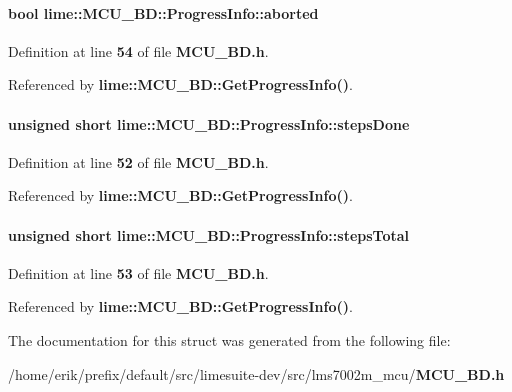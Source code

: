 \paragraph[{aborted}]{\setlength{\rightskip}{0pt plus 5cm}bool lime\+::\+M\+C\+U\+\_\+\+B\+D\+::\+Progress\+Info\+::aborted}\label{structlime_1_1MCU__BD_1_1ProgressInfo_ab5d35d043db9c1d51e6926514402bb37}


Definition at line {\bf 54} of file {\bf M\+C\+U\+\_\+\+B\+D.\+h}.



Referenced by {\bf lime\+::\+M\+C\+U\+\_\+\+B\+D\+::\+Get\+Progress\+Info()}.

\paragraph[{steps\+Done}]{\setlength{\rightskip}{0pt plus 5cm}unsigned short lime\+::\+M\+C\+U\+\_\+\+B\+D\+::\+Progress\+Info\+::steps\+Done}\label{structlime_1_1MCU__BD_1_1ProgressInfo_ac486e83e582d981ac0a2ba6416a13573}


Definition at line {\bf 52} of file {\bf M\+C\+U\+\_\+\+B\+D.\+h}.



Referenced by {\bf lime\+::\+M\+C\+U\+\_\+\+B\+D\+::\+Get\+Progress\+Info()}.

\paragraph[{steps\+Total}]{\setlength{\rightskip}{0pt plus 5cm}unsigned short lime\+::\+M\+C\+U\+\_\+\+B\+D\+::\+Progress\+Info\+::steps\+Total}\label{structlime_1_1MCU__BD_1_1ProgressInfo_adeb3741e8befea3f0673c4f69ff7949b}


Definition at line {\bf 53} of file {\bf M\+C\+U\+\_\+\+B\+D.\+h}.



Referenced by {\bf lime\+::\+M\+C\+U\+\_\+\+B\+D\+::\+Get\+Progress\+Info()}.



The documentation for this struct was generated from the following file\+:\begin{DoxyCompactItemize}
\item 
/home/erik/prefix/default/src/limesuite-\/dev/src/lms7002m\+\_\+mcu/{\bf M\+C\+U\+\_\+\+B\+D.\+h}\end{DoxyCompactItemize}
